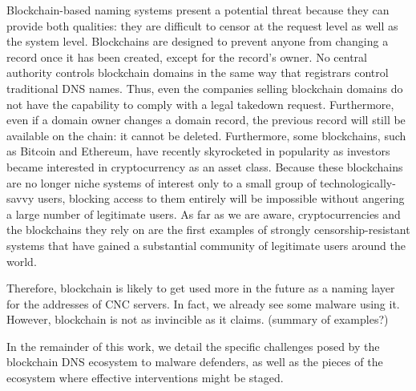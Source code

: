 \documentclass[10pt,sigconf,letterpaper]{acmart}
\begin{document}
Blockchain-based naming systems present a potential threat 
because they can provide 
both qualities: they are difficult to censor at the request 
level as well as the system level. Blockchains are designed 
to prevent anyone from changing a record once it has been 
created, except for the record's owner. No central authority 
controls blockchain domains in the same way that registrars 
control traditional DNS names. Thus, even the companies 
selling blockchain domains do not have the capability to 
comply with a legal takedown request. Furthermore, even if a 
domain owner changes a domain record, the previous record 
will still be available on the chain: it cannot be deleted. 
Furthermore, some blockchains, such as Bitcoin and Ethereum, have recently 
skyrocketed in popularity as investors became interested in cryptocurrency as 
an asset class. Because these blockchains are no longer niche systems of 
interest only to a small group of technologically-savvy users, blocking access 
to them entirely will be impossible without angering a large number of 
legitimate users. As far as we are aware, cryptocurrencies and the blockchains 
they rely on are the first examples of strongly censorship-resistant systems 
that have gained a substantial community of legitimate users around the world.

Therefore, blockchain is likely to get used more in the future as a naming 
layer for the addresses of CNC servers. In fact, we already see some malware 
using it. However, blockchain is not as invincible as it claims. (summary of 
examples?)

In the remainder of this work, we detail the specific 
challenges posed by the blockchain DNS ecosystem to malware 
defenders, as well as the pieces of the ecosystem where 
effective interventions might be staged.



\end{document}
